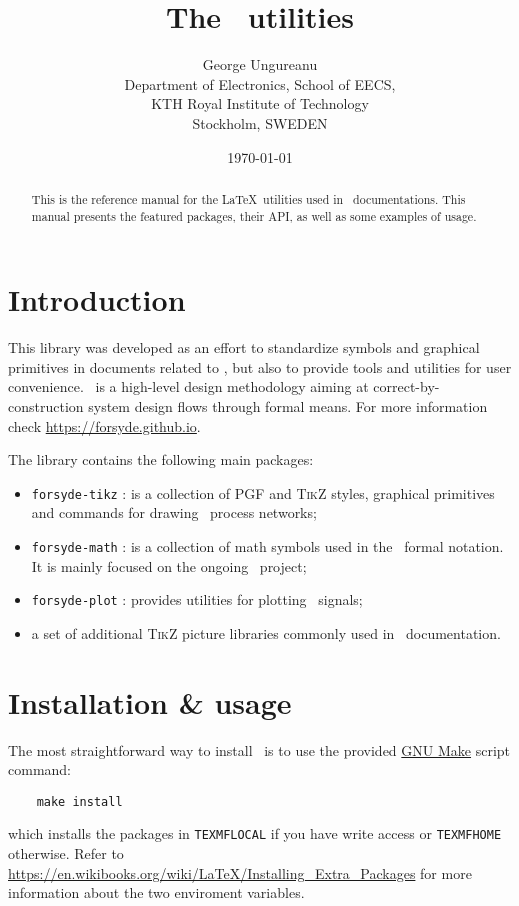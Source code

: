 \documentclass[10pt]{article}
\title{The \ForSyDeLaTeX\ utilities}
\author{
  George Ungureanu \\
  \small Department of Electronics, School of EECS,\\
  \small KTH Royal Institute of Technology\\
  \small Stockholm, SWEDEN
}
\date{\today}
\begin{document}
\maketitle
\reversemarginpar

\begin{abstract}
\noindent This is the reference manual for the \LaTeX\ utilities used in \ForSyDe\ documentations. This manual presents the featured packages, their API, as well as some examples of usage.
\end{abstract}

\section{Introduction}

This library was developed as an effort to standardize symbols and graphical primitives in documents related to \ForSyDe, but also to provide tools and utilities for user convenience. \ForSyDe\ is a high-level design methodology aiming at correct-by-construction system design flows through formal means. For more information check \url{https://forsyde.github.io}.

The library contains the following main packages:
\begin{itemize}
\item \texttt{forsyde-tikz} : is a collection of \textsc{PGF} and \textsc{TikZ} styles, graphical primitives and commands for drawing \ForSyDe\ process networks;
\item \texttt{forsyde-math} : is a collection of math symbols used in the \ForSyDe\ formal notation. It is mainly focused on the ongoing \ForSyDeAtom\ project;
\item \texttt{forsyde-plot} : provides utilities for plotting \ForSyDe\ signals;
\item a set of additional \textsc{TikZ} picture libraries commonly used in \ForSyDe\ documentation.
\end{itemize}

\section{Installation \& usage}

The most straightforward way to install \ForSyDeLaTeX\ is to use the provided  \href{https://www.gnu.org/software/make/}{GNU Make} script command:
%
\begin{verbatim}
    make install
\end{verbatim}
%
\noindent which installs the packages in \texttt{TEXMFLOCAL} if you have write access or \texttt{TEXMFHOME} otherwise. Refer to \url{https://en.wikibooks.org/wiki/LaTeX/Installing_Extra_Packages} for more information about the two enviroment variables.
\end{document}
